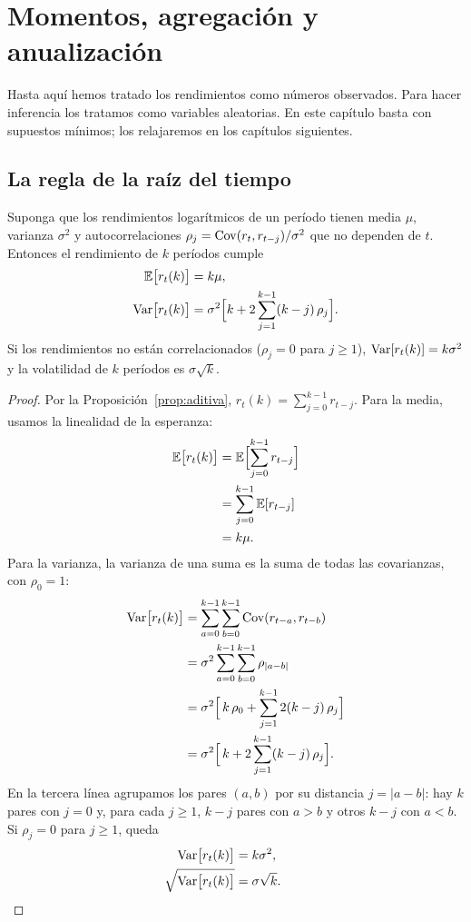 \section{Momentos, agregación y anualización}

Hasta aquí hemos tratado los rendimientos como números observados. Para hacer inferencia los tratamos
como variables aleatorias. En este capítulo basta con supuestos mínimos; los relajaremos en los
capítulos siguientes.

\subsection{La regla de la raíz del tiempo}

\begin{proposicion}\label{prop:agregmom}
Suponga que los rendimientos logarítmicos de un período tienen media $\mu$, varianza $\sigma^2$ y
autocorrelaciones $\rho_j=\operatorname{Cov}(r_t,r_{t-j})/\sigma^2$ que no dependen de $t$. Entonces el rendimiento de
$k$ períodos cumple
\begin{align*}
  \mathbb{E}\bigl[r_t(k)\bigr]&=k\mu,\\
  \operatorname{Var}\bigl[r_t(k)\bigr]&=\sigma^2\Bigl[k+2\sum_{j=1}^{k-1}(k-j)\,\rho_j\Bigr].
\end{align*}
Si los rendimientos no están correlacionados ($\rho_j=0$ para $j\ge1$), $\operatorname{Var}[r_t(k)]=k\sigma^2$ y la
volatilidad de $k$ períodos es $\sigma\sqrt{k}$.
\end{proposicion}

\begin{proof}
Por la Proposición~\ref{prop:aditiva}, $r_t(k)=\sum_{j=0}^{k-1}r_{t-j}$. Para la media, usamos la
linealidad de la esperanza:
\begin{align*}
  \mathbb{E}\bigl[r_t(k)\bigr] &= \mathbb{E}\Bigl[\sum_{j=0}^{k-1}r_{t-j}\Bigr]\\
                       &= \sum_{j=0}^{k-1}\mathbb{E}[r_{t-j}]\\
                       &= k\mu.
\end{align*}
Para la varianza, la varianza de una suma es la suma de todas las covarianzas, con $\rho_0=1$:
\begin{align*}
  \operatorname{Var}\bigl[r_t(k)\bigr]
    &= \sum_{a=0}^{k-1}\sum_{b=0}^{k-1}\operatorname{Cov}(r_{t-a},r_{t-b})\\
    &= \sigma^2\sum_{a=0}^{k-1}\sum_{b=0}^{k-1}\rho_{|a-b|}\\
    &= \sigma^2\Bigl[\,k\,\rho_0+\sum_{j=1}^{k-1}2(k-j)\,\rho_j\Bigr]\\
    &= \sigma^2\Bigl[\,k+2\sum_{j=1}^{k-1}(k-j)\,\rho_j\Bigr].
\end{align*}
En la tercera línea agrupamos los pares $(a,b)$ por su distancia $j=|a-b|$: hay $k$ pares con $j=0$ y,
para cada $j\ge1$, $k-j$ pares con $a>b$ y otros $k-j$ con $a<b$. Si $\rho_j=0$ para $j\ge1$, queda
\begin{align*}
  \operatorname{Var}\bigl[r_t(k)\bigr] &= k\sigma^2,\\
  \sqrt{\operatorname{Var}\bigl[r_t(k)\bigr]} &= \sigma\sqrt k. && \qedhere
\end{align*}
\end{proof}

